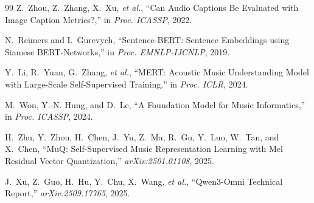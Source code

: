 \documentclass[conference]{IEEEtran}
\begin{document}
\begin{thebibliography}{99}
Z.~Zhou, Z.~Zhang, X.~Xu, \emph{et al.},
``Can Audio Captions Be Evaluated with Image Caption Metrics?,'' in \emph{Proc. ICASSP}, 2022.

N.~Reimers and I.~Gurevych,
``Sentence-BERT: Sentence Embeddings using Siamese BERT-Networks,'' in \emph{Proc.
EMNLP-IJCNLP}, 2019.

Y.~Li, R.~Yuan, G.~Zhang, \emph{et al.},
``MERT: Acoustic Music Understanding Model with Large-Scale Self-Supervised Training,'' in
\emph{Proc. ICLR}, 2024.

M.~Won, Y.-N. Hung, and D.~Le,
``A Foundation Model for Music Informatics,'' in \emph{Proc. ICASSP}, 2024.

H.~Zhu, Y.~Zhou, H.~Chen, J.~Yu, Z.~Ma, R.~Gu, Y.~Luo, W.~Tan, and X.~Chen,
``MuQ: Self-Supervised Music Representation Learning with Mel Residual Vector Quantization,''
\emph{arXiv:2501.01108}, 2025.

J.~Xu, Z.~Guo, H.~Hu, Y.~Chu, X.~Wang, \emph{et al.},
``Qwen3-Omni Technical Report,'' \emph{arXiv:2509.17765}, 2025.

\end{thebibliography}
\end{document}
